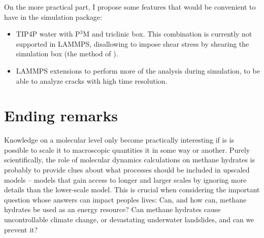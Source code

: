 On the more practical part, I propose some features that would be convenient to have in the simulation package:
\begin{itemize}
\item TIP4P water with P$^3$M and triclinic box. This combination is currently not supported in LAMMPS, disallowing to impose shear stress by shearing the simulation box (the method of \citet{Parrinello1981}).
\item LAMMPS extensions to perform more of the analysis during simulation, to be able to analyze cracks with high time resolution.
\end{itemize}
 
\section{Ending remarks}
Knowledge on a molecular level only become practically interesting if is is possible to scale it to macroscopic quantities it in some way or another. Purely scientifically, the role of molecular dynamics calculations on methane hydrates is probably to provide clues about what processes should be included in upscaled models -- models that gain access to longer and larger scales by ignoring more details than the lower-scale model. This is crucial when considering the important question whose answers can impact peoples lives: Can, and how can, methane hydrates be used as an energy resource? Can methane hydrates cause uncontrollable climate change, or devastating underwater landslides, and can we prevent it? 